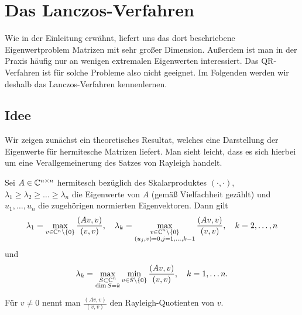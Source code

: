 \documentclass{article}
\begin{document}
\section{Das Lanczos-Verfahren}
Wie in der Einleitung erwähnt, liefert uns das dort beschriebene Eigenwertproblem Matrizen mit sehr großer Dimension. Außerdem ist man in der Praxis häufig nur an wenigen extremalen Eigenwerten interessiert. Das QR-Verfahren ist für solche Probleme also nicht geeignet. Im Folgenden werden wir deshalb das Lanczos-Verfahren kennenlernen.

\subsection{Idee}

Wir zeigen zunächst ein theoretisches Resultat, welches eine Darstellung der Eigenwerte für hermitesche Matrizen liefert. Man sieht leicht, dass es sich hierbei um eine Verallgemeinerung des Satzes von Rayleigh handelt.

\begin{lemma} \label{Rayleigh}
	Sei $A \in \mathbb{C}^{n \times n}$ hermitesch bezüglich des Skalarproduktes $(\cdot, \cdot)$, $\lambda_1 \geq \lambda_2 \geq \dots \geq \lambda_n$ die Eigenwerte von $A$ (gemäß Vielfachheit gezählt) und $u_1, \dots, u_n$ die zugehörigen normierten Eigenvektoren. Dann gilt
	\begin{align}\label{lambdamax}
		\lambda_1 = \max_{v \in \mathbb{C}^n \setminus \{0\}} \frac{(Av,v)}{(v,v)}, \quad \lambda_k = \max_{\substack{v \in \mathbb{C}^n \setminus \{0\}\\
    (u_j,v) = 0, j= 1,\dots, k-1}} \frac{(Av,v)}{(v,v)}, \quad k= 2, \dots, n
	\end{align}
	und
	\begin{align}\label{lambdamaxmin}
		\lambda_k = \max_{\substack{S \subset \mathbb{C}^n\\
    \dim S = k}} \min_{v \in S \setminus \{0\}} \frac{(Av,v)}{(v,v)}, \quad k=1, \dots n.
	\end{align}

	Für $v \neq 0$ nennt man $\frac{(Av,v)}{(v,v)}$ den Rayleigh-Quotienten von $v$.
\end{lemma}
\end{document}
